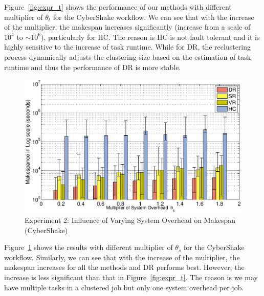 Figure~\ref{fig:expr_t} shows the performance of our methods with different multiplier of $\theta_{t}$ for the CyberShake workflow. We can see that with the increase of the multiplier, the makespan increases significantly (increase from a scale of $10^4$ to $\sim 10^6$), particularly for HC. The reason is HC is not fault tolerant and it is highly sensitive to the increase of task runtime. While for DR, the reclustering process dynamically adjusts the clustering size based on the estimation of task runtime and thus the performance of DR is more stable. 

\begin{figure}[!htb]
\centering
  \includegraphics[width=1\linewidth]{figures/tolerance/d.eps}
  \caption{Experiment 2: Influence of Varying System Overhead on Makespan (CyberShake)}
  \label{fig:expr_d}
\end{figure}

Figure~\ref{fig:expr_d} shows the results with different multiplier of $\theta_{s}$ for the CyberShake workflow. Similarly, we can see that with the increase of the multiplier, the makespan increases for all the methods and DR performs best. However, the increase is less significant than that in Figure~\ref{fig:expr_t}. The reason is we may have multiple tasks in a clustered job but only one system overhead per job.



